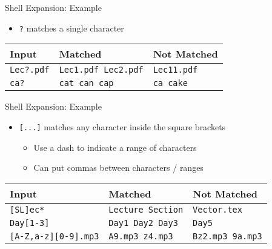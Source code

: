 \documentclass[11pt]{beamer}
\begin{document}
\begin{frame}[fragile]{Shell Expansion: Example}
  \begin{itemize}
    \item \texttt{?} matches a single character
  \end{itemize}
  \begin{center}
    {\small
    \begin{tabular}{|l|l|l|}
      \hline
      Input & Matched & Not Matched\\ \hline
      \texttt{Lec?.pdf} & \texttt{Lec1.pdf Lec2.pdf} & \texttt{Lec11.pdf}\\ \hline
      \texttt{ca?} & \texttt{cat can cap} & \texttt{ca cake}\\ \hline
    \end{tabular}
    }
  \end{center}
\end{frame}

\begin{frame}[fragile]{Shell Expansion: Example}
  \begin{itemize}
    \item \texttt{[...]} matches any character inside the square brackets
    \begin{itemize}
      \item Use a dash to indicate a range of characters
      \item Can put commas between characters / ranges
    \end{itemize}
  \end{itemize}
  \begin{center}
    {\small
    \begin{tabular}{|l|l|l|}
      \hline
      Input & Matched & Not Matched\\ \hline
      \texttt{[SL]ec*} & \texttt{Lecture Section} & \texttt{Vector.tex}\\ \hline
      \texttt{Day[1-3]} & \texttt{Day1 Day2 Day3} & \texttt{Day5}\\ \hline
      \texttt{[A-Z,a-z][0-9].mp3} & \texttt{A9.mp3 z4.mp3} & \texttt{Bz2.mp3 9a.mp3}\\ \hline
    \end{tabular}
    }
  \end{center}
\end{frame}
\end{document}
